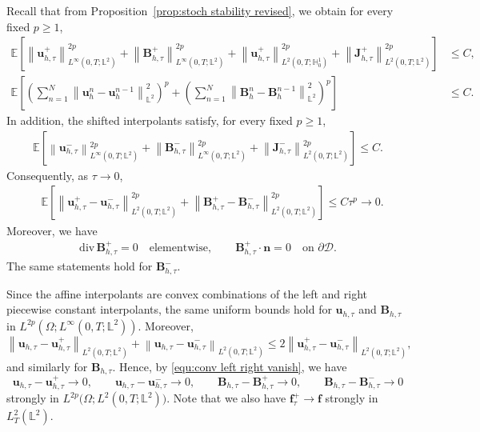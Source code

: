 \documentclass[11pt, reqno]{amsart}
\theoremstyle{definition}
\numberwithin{equation}{section}
\newcommand{\divg}{\mathrm{div}\,}
\newcommand{\bff}{\boldsymbol}
\newcommand{\bb}{\mathbb}
\newcommand{\norm}[2]{\left\|{#1}\right\|_{#2}}
\begin{document}
Recall that from Proposition~\ref{prop:stoch stability revised}, we obtain for every fixed $p\ge1$,
\begin{equation}\label{equ:conv uniform bounds}
\begin{aligned}
	\bb{E}\left[
	\norm{\bff{u}_{h,\tau}^{+}}{L^\infty(0,T;\bb{L}^2)}^{2p}
	+
	\norm{\bff{B}_{h,\tau}^{+}}{L^\infty(0,T;\bb{L}^2)}^{2p}
	+
	\norm{\bff{u}_{h,\tau}^{+}}{L^2(0,T;\bb{H}_0^1)}^{2p}
	+
	\norm{\bff{J}_{h,\tau}^{+}}{L^2(0,T;\bb{L}^2)}^{2p}
	\right]
	&\leq C,
	\\
	\bb{E}\left[
	\left(\sum_{n=1}^{N}
	\norm{\bff{u}_h^n-\bff{u}_h^{n-1}}{\bb{L}^2}^2
	\right)^p
	+
	\left(\sum_{n=1}^{N}
	\norm{\bff{B}_h^n-\bff{B}_h^{n-1}}{\bb{L}^2}^2
	\right)^p
	\right]
	&\leq C.
\end{aligned}
\end{equation}
In addition, the shifted interpolants satisfy, for every fixed $p\ge1$,
\begin{align}\label{equ:conv shifted uniform bounds}
	\bb E\left[
	\norm{\bff u_{h,\tau}^{-}}{L^\infty(0,T;\bb L^2)}^{2p}
	+
	\norm{\bff B_{h,\tau}^{-}}{L^\infty(0,T;\bb L^2)}^{2p}
	+
	\norm{\bff J_{h,\tau}^{-}}{L^2(0,T;\bb L^2)}^{2p}
	\right]
	\le C.
\end{align}
Consequently, as $\tau\to0$,
\begin{align}\label{equ:conv left right vanish}
	&\bb{E}\left[
	\norm{\bff{u}_{h,\tau}^{+}-\bff{u}_{h,\tau}^{-}}
	{L^2(0,T;\bb{L}^2)}^{2p}
	+
	\norm{\bff{B}_{h,\tau}^{+}-\bff{B}_{h,\tau}^{-}}
	{L^2(0,T;\bb{L}^2)}^{2p}
	\right] \leq C\tau^p \to 0.
\end{align}
Moreover, we have
\begin{align}\label{equ:conv discrete divB}
	\divg\bff{B}_{h,\tau}^{+}=0
	\quad\text{elementwise},
	\qquad
	\bff{B}_{h,\tau}^{+}\cdot\bff{n}=0
	\quad\text{on }\partial\mathscr{D}.
\end{align}
The same statements hold for $\bff B_{h,\tau}^{-}$.

Since the affine interpolants are convex combinations of the left and right piecewise constant interpolants, the same uniform bounds hold for $\bff u_{h,\tau}$ and $\bff B_{h,\tau}$ in $L^{2p}(\Omega;L^\infty(0,T;\bb L^2))$. Moreover,
\begin{equation}\label{equ:uht plus minus}
\norm{\bff u_{h,\tau}-\bff u_{h,\tau}^{+}}
{L^2(0,T;\bb L^2)}
+
\norm{\bff u_{h,\tau}-\bff u_{h,\tau}^{-}}
{L^2(0,T;\bb L^2)}
\le
2\norm{\bff u_{h,\tau}^{+}-\bff u_{h,\tau}^{-}}
{L^2(0,T;\bb L^2)},
\end{equation}
and similarly for $\bff B_{h,\tau}$. Hence, by
\eqref{equ:conv left right vanish}, we have
\[
\bff u_{h,\tau}-\bff u_{h,\tau}^{+}\to0,\qquad
\bff u_{h,\tau}-\bff u_{h,\tau}^{-}\to0,\qquad
\bff B_{h,\tau}-\bff B_{h,\tau}^{+}\to0,\qquad
\bff B_{h,\tau}-\bff B_{h,\tau}^{-}\to0
\]
strongly in $L^{2p}\bigl(\Omega;L^2(0,T;\bb L^2)\bigr)$. Note that we also have $\bff f_\tau^+\to \bff f$ strongly in $L^2_T(\bb L^2)$.
\end{document}

